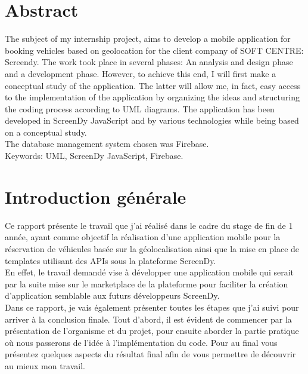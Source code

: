 \documentclass[12pt,a4paper]{report}
\begin{document}
	\chapter*{Abstract}
	The subject of my internship project, aims to develop a mobile application for booking vehicles based on geolocation for the client company of SOFT CENTRE: Screendy. The work took place in several phases: An analysis and design phase and a development phase.
However, to achieve this end, I will first make a conceptual study of the application. The latter will allow me, in fact, easy access to the implementation of the application by organizing the ideas and structuring the coding process according to UML diagrams. The application has been developed in \guillemotleft ScreenDy JavaScript \guillemotright and by various technologies while being based on a conceptual study. \\
The database management system chosen was Firebase.\\
Keywords: UML, ScreenDy JavaScript, Firebase. 


	\listoftables
	\listoffigures
	\tableofcontents

	\chapter*{Introduction générale}
	Ce rapport présente le travail que j'ai réalisé dans le cadre du stage de fin de 1 ann\'ee, ayant comme objectif la réalisation d'une application mobile pour la réservation de véhicules basée sur la géolocalisation ainsi que la mise en place de templates utilisant des APIs sous la plateforme ScreenDy.\\
	En effet, le travail demandé vise à développer une application mobile qui serait par la suite mise sur le marketplace de la plateforme pour faciliter la création d'application semblable aux futurs développeurs ScreenDy.\\
	Dans ce rapport, je vais également présenter toutes les étapes que j'ai suivi pour arriver à la conclusion finale. Tout d'abord, il est évident de commencer par la présentation de l'organisme et du projet, pour ensuite aborder la partie pratique où nous passerons de l’idée à l’implémentation du code. Pour au final vous présentez quelques aspects du résultat final afin de vous permettre de découvrir au mieux mon travail.\\
	
\end{document}
